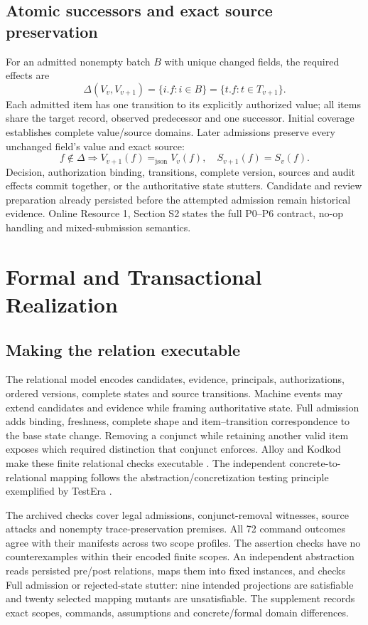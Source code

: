 \documentclass[10pt,a4paper,twocolumn]{article}
\newcommand{\jeq}{\mathrel{=_{\mathrm{json}}}}
\begin{document}
\subsection{Atomic successors and exact source preservation}
For an admitted nonempty batch $B$ with unique changed fields, the required effects are
\begin{equation}
\Delta(V_v,V_{v+1})=\{i.f:i\in B\}=\{t.f:t\in T_{v+1}\}.
\end{equation}
Each admitted item has one transition to its explicitly authorized value; all items share the target record, observed predecessor and one successor. Initial coverage establishes complete value/source domains. Later admissions preserve every unchanged field's value and exact source:
\begin{equation}
f\notin\Delta\Rightarrow V_{v+1}(f)\jeq V_v(f),\quad S_{v+1}(f)=S_v(f).
\end{equation}
Decision, authorization binding, transitions, complete version, sources and audit effects commit together, or the authoritative state stutters. Candidate and review preparation already persisted before the attempted admission remain historical evidence. Online Resource 1, Section S2 states the full P0--P6 contract, no-op handling and mixed-submission semantics.

\section{Formal and Transactional \mbox{Realization}}
\subsection{Making the relation executable}
The relational model encodes candidates, evidence, principals, authorizations, ordered versions, complete states and source transitions. Machine events may extend candidates and evidence while framing authoritative state. Full admission adds binding, freshness, complete shape and item--transition correspondence to the base state change. Removing a conjunct while retaining another valid item exposes which required distinction that conjunct enforces. Alloy and Kodkod make these finite relational checks executable \citep{jackson2002alloy,torlak2007kodkod}. The independent concrete-to-relational mapping follows the abstraction/concretization testing principle exemplified by TestEra \citep{marinov2001testera}.

The archived checks cover legal admissions, conjunct-removal witnesses, source attacks and nonempty trace-preservation premises. All 72 command outcomes agree with their manifests across two scope profiles. The assertion checks have no counterexamples within their encoded finite scopes. An independent abstraction reads persisted pre/post relations, maps them into fixed instances, and checks Full admission or rejected-state stutter: nine intended projections are satisfiable and twenty selected mapping mutants are unsatisfiable. The supplement records exact scopes, commands, assumptions and concrete/formal domain differences.
\end{document}

